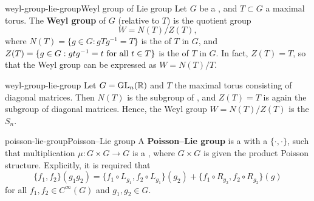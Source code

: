 \begin{topic}{weyl-group-lie-group}{Weyl group of Lie group}
    Let $G$ be a   , and $T \subset G$ a maximal torus. The \textbf{Weyl group} of $G$ (relative to $T$) is the quotient group
    \[ W = N(T) / Z(T) , \]
    where $N(T) = \{ g \in G : gTg^{-1} = T \}$ is the  of $T$ in $G$, and $Z(T) = \{ g \in G : gtg^{-1} = t \textup{ for all } t \in T \}$ is the  of $T$ in $G$. In fact, $Z(T) = T$, so that the Weyl group can be expressed as $W = N(T) / T$.
\end{topic}

\begin{example}{weyl-group-lie-group}
    Let $G = \textup{GL}_n(\mathbb{R})$ and $T$ the maximal torus consisting of diagonal matrices. Then $N(T)$ is the subgroup of , and $Z(T) = T$ is again the subgroup of diagonal matrices. Hence, the Weyl group $W = N(T)/Z(T)$ is the  $S_n$.
\end{example}

\begin{topic}{poisson-lie-group}{Poisson--Lie group}
    A \textbf{Poisson--Lie group} is a  with a  $\{ \cdot, \cdot \}$, such that multiplication $\mu : G \times G \to G$ is a , where $G \times G$ is given the product Poisson structure. Explicitly, it is required that
    \[ \{ f_1, f_2 \}(g_1 g_2) = \{ f_1 \circ L_{g_1}, f_2 \circ L_{g_1} \}(g_2) + \{ f_1 \circ R_{g_2}, f_2 \circ R_{g_2} \}(g) \]
    for all $f_1, f_2 \in C^\infty(G)$ and $g_1, g_2 \in G$.
\end{topic}
